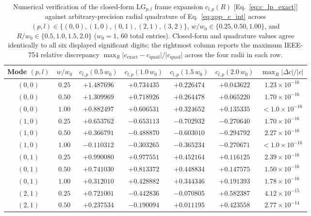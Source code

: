 \documentclass[aps,pra,reprint,nofootinbib,floatfix,longbibliography]{revtex4-2}
\theoremstyle{remark}
\newcommand{\abs}[1]{\lvert #1 \rvert}
\begin{document}
\begin{table}[t]
\caption{Numerical verification of the closed-form $\mathrm{LG}_{p,l}$ frame expansion $c_{l,p}(R)$ [Eq.~\eqref{eq:c_lp_exact}] against arbitrary-precision radial quadrature of Eq.~\eqref{eq:app_c_int} across $(p,l) \in \{(0,0),(1,0),(0,1),(2,1),(3,2)\}$, $w/w_0 \in \{0.25,0.50,1.00\}$, and $R/w_0 \in \{0.5,1.0,1.5,2.0\}$ ($w_0 = 1$, 60 total entries). Closed-form and quadrature values agree identically to all six displayed significant digits; the rightmost column reports the maximum IEEE-754 relative discrepancy $\max_R \abs{c_{\mathrm{exact}} - c_{\mathrm{quad}}}/\abs{c_{\mathrm{quad}}}$ across the four radii in each row.}
\label{tab:c_lp_verification}
\begin{ruledtabular}
\footnotesize
\begin{tabular}{ccccccc}
Mode $(p,l)$ & $w/w_0$ & $c_{l,p}(0.5\,w_0)$ & $c_{l,p}(1.0\,w_0)$ & $c_{l,p}(1.5\,w_0)$ & $c_{l,p}(2.0\,w_0)$ & $\max_R \abs{\Delta c}/\abs{c}$ \\
\hline
$(0,0)$ & $0.25$ & $+1.487696$ & $+0.734435$ & $+0.226474$ & $+0.043622$ & $1.23\times 10^{-16}$ \\
$(0,0)$ & $0.50$ & $+1.309969$ & $+0.718926$ & $+0.264478$ & $+0.065220$ & $1.70\times 10^{-16}$ \\
$(0,0)$ & $1.00$ & $+0.882497$ & $+0.606531$ & $+0.324652$ & $+0.135335$ & $< 1.0\times 10^{-16}$ \\
\hline
$(1,0)$ & $0.25$ & $+0.653762$ & $-0.653113$ & $-0.702932$ & $-0.270640$ & $1.70\times 10^{-16}$ \\
$(1,0)$ & $0.50$ & $+0.366791$ & $-0.488870$ & $-0.603010$ & $-0.294792$ & $2.27\times 10^{-16}$ \\
$(1,0)$ & $1.00$ & $-0.110312$ & $-0.303265$ & $-0.365234$ & $-0.270671$ & $< 1.0\times 10^{-16}$ \\
\hline
$(0,1)$ & $0.25$ & $+0.990080$ & $+0.977551$ & $+0.452164$ & $+0.116125$ & $2.39\times 10^{-16}$ \\
$(0,1)$ & $0.50$ & $+0.741030$ & $+0.813372$ & $+0.448834$ & $+0.147575$ & $1.50\times 10^{-16}$ \\
$(0,1)$ & $1.00$ & $+0.312010$ & $+0.428882$ & $+0.344346$ & $+0.191393$ & $1.78\times 10^{-16}$ \\
\hline
$(2,1)$ & $0.25$ & $+0.721001$ & $-0.442836$ & $-0.070805$ & $+0.582387$ & $4.12\times 10^{-15}$ \\
$(2,1)$ & $0.50$ & $+0.237534$ & $-0.190094$ & $+0.011195$ & $+0.423558$ & $2.77\times 10^{-14}$ \\

\end{tabular}
\end{ruledtabular}
\end{table}
\end{document}
